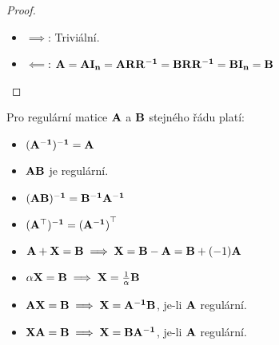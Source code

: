 \begin{proof}
    \leavevmode
    \begin{itemize}
        \item $\implies$: Triviální.

        \item $\impliedby$: $\mathbf{A} = \mathbf{A}\mathbf{I_{n}} = 
            \mathbf{A}\mathbf{R}\mathbf{R^{-1}} =
            \mathbf{B}\mathbf{R}\mathbf{R^{-1}} = \mathbf{B}\mathbf{I_{n}} = \mathbf{B}$
    \end{itemize}
\end{proof}

\begin{proposition}
    Pro regulární matice $\mathbf{A}$ a $\mathbf{B}$ stejného řádu platí:
    \begin{multicols}{2}
        \begin{itemize}
            \item $\mathbf{(\mathbf{A^{-1}})^{-1}} = \mathbf{A}$
            \item $\mathbf{A}\mathbf{B}$ je regulární.
            \item $\mathbf{(\mathbf{A}\mathbf{B})^{-1}} = \mathbf{B^{-1}}\mathbf{A^{-1}}$
            \item $\mathbf{(\mathbf{A}^{\top})^{-1}} = \mathbf{(\mathbf{A^{-1}})}^{\top}$
        \end{itemize}
    \end{multicols}
\end{proposition}

\begin{remark}
    \leavevmode
    \begin{itemize}
        \item $\mathbf{A} + \mathbf{X} = \mathbf{B} \implies \mathbf{X} = \mathbf{B} -
            \mathbf{A} = \mathbf{B} + (-1)\mathbf{A}$
        \item $\alpha\mathbf{X} = \mathbf{B} \implies \mathbf{X} =
            \frac{1}{\alpha}\mathbf{B}$
        \item $\mathbf{A}\mathbf{X} = \mathbf{B} \implies \mathbf{X} =
            \mathbf{A^{-1}}\mathbf{B}$, je-li $\mathbf{A}$ regulární.
        \item $\mathbf{X}\mathbf{A} = \mathbf{B} \implies \mathbf{X} =
            \mathbf{B}\mathbf{A^{-1}}$, je-li $\mathbf{A}$ regulární.
    \end{itemize}
\end{remark}
